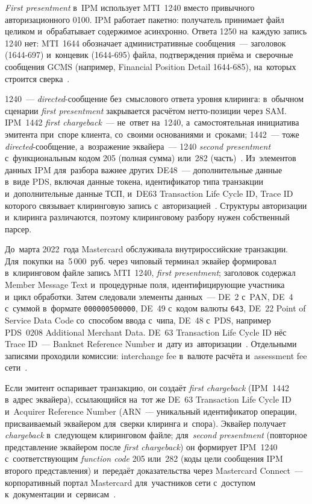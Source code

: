 \textit{First presentment} в~IPM использует MTI~1240 вместо привычного
авторизационного 0100. IPM работает пакетно: получатель принимает файл целиком
и~обрабатывает содержимое асинхронно. Ответа 1250 на~каждую запись 1240 нет:
MTI~1644 обозначает административные сообщения~--- заголовок (1644-697)
и~концевик (1644-695) файла, подтверждения приёма и~сверочные сообщения
GCMS (например, Financial Position Detail 1644-685), на~которых строится
сверка~\cite{mc-gcms-rm-2021}.

1240~--- \textit{directed}-сообщение без~смыслового ответа уровня клиринга:
в~обычном сценарии \textit{first presentment} закрывается расчётом нетто-позиции через
SAM. IPM~1442 \textit{first chargeback}~--- не~ответ на~1240, а~самостоятельная
инициатива эмитента при~споре клиента, со~своими основаниями и~сроками;
1442~--- тоже \textit{directed}-сообщение, а~возражение эквайера~--- 1240
\textit{second presentment} с~функциональным кодом 205 (полная сумма) или~282
(часть)~\cite{mc-chargeback-guide,mc-tpr}. Из~элементов данных IPM для~разбора
важнее других DE48~--- дополнительные данные в~виде PDS, включая данные
токена, идентификатор типа транзакции и~дополнительные данные ТСП,
и~DE63 Transaction Life Cycle ID, Trace ID которого связывает клиринговую
запись с~авторизацией~\cite{mc-gcms-rm-2021}. Структуры авторизации и~клиринга различаются,
поэтому клиринговому разбору нужен собственный парсер.

До~марта 2022~года Mastercard обслуживала внутрироссийские транзакции.
Для~покупки на~5\,000~руб. через чиповый терминал эквайер формировал
в~клиринговом файле запись MTI~1240, \textit{first presentment}; заголовок
содержал Member Message Text и~процедурные поля, идентифицирующие участника
и~цикл обработки. Затем следовали элементы данных~--- DE~2 с~PAN, DE~4 с~суммой
в~формате \texttt{000000500000}, DE~49 с~кодом валюты \texttt{643}, DE~22 Point
of Service Data Code со~способом ввода с~чипа, DE~48 с~PDS, например PDS~0208
Additional Merchant Data. DE~63 Transaction Life Cycle ID нёс Trace ID~---
Banknet Reference Number и~дату из~авторизации~\cite{mc-gcms-rm-2021}.
Отдельными записями проходили комиссии: interchange fee в~валюте расчёта
и~assessment fee сети~\cite{mc-chargeback-guide}.

Если эмитент оспаривает транзакцию, он создаёт \textit{first chargeback}
(IPM~1442 в~адрес эквайера), ссылающийся на~тот же DE~63 Transaction Life
Cycle ID и~Acquirer Reference Number (ARN~--- уникальный идентификатор операции,
присваиваемый эквайером для~сверки клиринга и~спора). Эквайер получает
\textit{chargeback} в~следующем клиринговом файле;
для~\textit{second presentment} (повторное представление эквайером после
\textit{first chargeback}) он формирует IPM~1240 с~соответствующим \textit{function code} 205
или~282 (коды цели сообщения IPM второго представления) и~передаёт
доказательства через Mastercard Connect~--- корпоративный портал Mastercard
для~участников сети с~доступом к~документации
и~сервисам~\cite{mc-chargeback-guide}.

